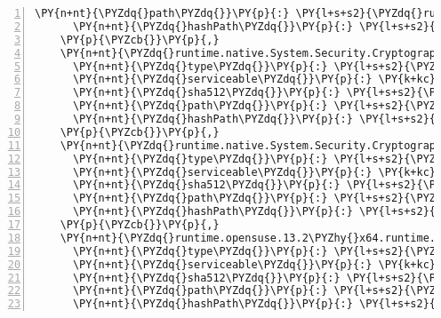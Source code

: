 \begin{Verbatim}[commandchars=\\\{\},numbers=left,firstnumber=1,stepnumber=1,numberblanklines=0]
      \PY{n+nt}{\PYZdq{}path\PYZdq{}}\PY{p}{:} \PY{l+s+s2}{\PYZdq{}runtime.native.system.net.http/4.3.0\PYZdq{}}\PY{p}{,}
      \PY{n+nt}{\PYZdq{}hashPath\PYZdq{}}\PY{p}{:} \PY{l+s+s2}{\PYZdq{}runtime.native.system.net.http.4.3.0.nupkg.sha512\PYZdq{}}
    \PY{p}{\PYZcb{}}\PY{p}{,}
    \PY{n+nt}{\PYZdq{}runtime.native.System.Security.Cryptography.Apple/4.3.0\PYZdq{}}\PY{p}{:} \PY{p}{\PYZob{}}
      \PY{n+nt}{\PYZdq{}type\PYZdq{}}\PY{p}{:} \PY{l+s+s2}{\PYZdq{}package\PYZdq{}}\PY{p}{,}
      \PY{n+nt}{\PYZdq{}serviceable\PYZdq{}}\PY{p}{:} \PY{k+kc}{true}\PY{p}{,}
      \PY{n+nt}{\PYZdq{}sha512\PYZdq{}}\PY{p}{:} \PY{l+s+s2}{\PYZdq{}sha512\PYZhy{}DloMk88juo0OuOWr56QG7MNchmafTLYWvABy36izkrLI5VledI0rq28KGs1i9wbpeT9NPQrx/wTf8U2vazqQ3Q==\PYZdq{}}\PY{p}{,}
      \PY{n+nt}{\PYZdq{}path\PYZdq{}}\PY{p}{:} \PY{l+s+s2}{\PYZdq{}runtime.native.system.security.cryptography.apple/4.3.0\PYZdq{}}\PY{p}{,}
      \PY{n+nt}{\PYZdq{}hashPath\PYZdq{}}\PY{p}{:} \PY{l+s+s2}{\PYZdq{}runtime.native.system.security.cryptography.apple.4.3.0.nupkg.sha512\PYZdq{}}
    \PY{p}{\PYZcb{}}\PY{p}{,}
    \PY{n+nt}{\PYZdq{}runtime.native.System.Security.Cryptography.OpenSsl/4.3.0\PYZdq{}}\PY{p}{:} \PY{p}{\PYZob{}}
      \PY{n+nt}{\PYZdq{}type\PYZdq{}}\PY{p}{:} \PY{l+s+s2}{\PYZdq{}package\PYZdq{}}\PY{p}{,}
      \PY{n+nt}{\PYZdq{}serviceable\PYZdq{}}\PY{p}{:} \PY{k+kc}{true}\PY{p}{,}
      \PY{n+nt}{\PYZdq{}sha512\PYZdq{}}\PY{p}{:} \PY{l+s+s2}{\PYZdq{}sha512\PYZhy{}NS1U+700m4KFRHR5o4vo9DSlTmlCKu/u7dtE5sUHVIPB+xpXxYQvgBgA6wEIeCz6Yfn0Z52/72WYsToCEPJnrw==\PYZdq{}}\PY{p}{,}
      \PY{n+nt}{\PYZdq{}path\PYZdq{}}\PY{p}{:} \PY{l+s+s2}{\PYZdq{}runtime.native.system.security.cryptography.openssl/4.3.0\PYZdq{}}\PY{p}{,}
      \PY{n+nt}{\PYZdq{}hashPath\PYZdq{}}\PY{p}{:} \PY{l+s+s2}{\PYZdq{}runtime.native.system.security.cryptography.openssl.4.3.0.nupkg.sha512\PYZdq{}}
    \PY{p}{\PYZcb{}}\PY{p}{,}
    \PY{n+nt}{\PYZdq{}runtime.opensuse.13.2\PYZhy{}x64.runtime.native.System.Security.Cryptography.OpenSsl/4.3.0\PYZdq{}}\PY{p}{:} \PY{p}{\PYZob{}}
      \PY{n+nt}{\PYZdq{}type\PYZdq{}}\PY{p}{:} \PY{l+s+s2}{\PYZdq{}package\PYZdq{}}\PY{p}{,}
      \PY{n+nt}{\PYZdq{}serviceable\PYZdq{}}\PY{p}{:} \PY{k+kc}{true}\PY{p}{,}
      \PY{n+nt}{\PYZdq{}sha512\PYZdq{}}\PY{p}{:} \PY{l+s+s2}{\PYZdq{}sha512\PYZhy{}b3pthNgxxFcD+Pc0WSEoC0+md3MyhRS6aCEeenvNE3Fdw1HyJ18ZhRFVJJzIeR/O/jpxPboB805Ho0T3Ul7w8A==\PYZdq{}}\PY{p}{,}
      \PY{n+nt}{\PYZdq{}path\PYZdq{}}\PY{p}{:} \PY{l+s+s2}{\PYZdq{}runtime.opensuse.13.2\PYZhy{}x64.runtime.native.system.security.cryptography.openssl/4.3.0\PYZdq{}}\PY{p}{,}
      \PY{n+nt}{\PYZdq{}hashPath\PYZdq{}}\PY{p}{:} \PY{l+s+s2}{\PYZdq{}runtime.opensuse.13.2\PYZhy{}x64.runtime.native.system.security.cryptography.openssl.4.3.0.nupkg.sha512\PYZdq{}}

\end{Verbatim}
